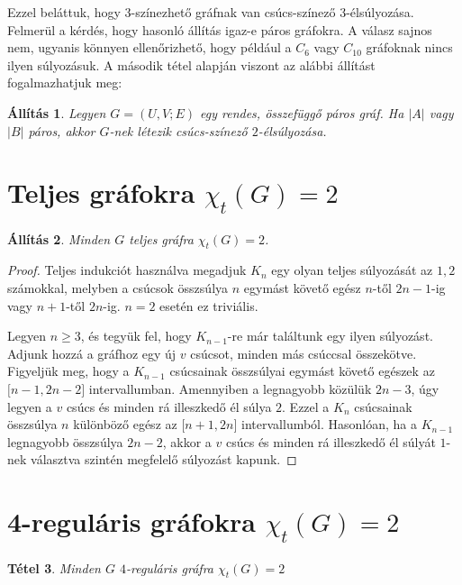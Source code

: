 \documentclass[12pt, a4paper]{report}
\newtheorem{tét}{Tétel}[section]
\newtheorem{áll}[tét]{Állítás}
\theoremstyle{remark}
\theoremstyle{definition}
\begin{document}
Ezzel beláttuk, hogy $3$-színezhető gráfnak van csúcs-színező $3$-élsúlyozása. Felmerül a kérdés, hogy hasonló állítás igaz-e páros gráfokra. A válasz sajnos nem, ugyanis könnyen ellenőrizhető, hogy például a $C_6$ vagy $C_{10}$ gráfoknak nincs ilyen súlyozásuk. A második tétel alapján viszont az alábbi állítást fogalmazhatjuk meg:

\begin{áll}
Legyen $G = (U, V; E)$ egy rendes, összefüggő páros gráf. Ha $|A|$ vagy $|B|$ páros, akkor $G$-nek létezik csúcs-színező $2$-élsúlyozása.
\end{áll}

\section{Teljes gráfokra $χ_t(G) = 2$}

\begin{áll}
Minden $G$ teljes gráfra $\chi_t(G) = 2$.
\end{áll}

\begin{proof}
Teljes indukciót használva megadjuk $K_n$ egy olyan teljes súlyozását az $1, 2$ számokkal, melyben a csúcsok összsúlya $n$ egymást követő egész $n$-től $2n - 1$-ig vagy $n + 1$-től $2n$-ig. $n = 2$ esetén ez triviális.

Legyen $n \geq 3$, és tegyük fel, hogy $K_{n - 1}$-re már találtunk egy ilyen súlyozást. Adjunk hozzá a gráfhoz egy új $v$ csúcsot, minden más csúccsal összekötve. Figyeljük meg, hogy a $K_{n - 1}$ csúcsainak összsúlyai egymást követő egészek az $\lbrack n - 1, 2n - 2 \rbrack$ intervallumban. Amennyiben a legnagyobb közülük $2n - 3$, úgy legyen a $v$ csúcs és minden rá illeszkedő él súlya $2$. Ezzel a $K_n$ csúcsainak összsúlya $n$ különböző egész az $\lbrack n + 1, 2n \rbrack$ intervallumból. Hasonlóan, ha a $K_{n - 1}$ legnagyobb összsúlya $2n - 2$, akkor a $v$ csúcs és minden rá illeszkedő él súlyát $1$-nek választva szintén megfelelő súlyozást kapunk.
\end{proof}

\section{4-reguláris gráfokra $χ_t(G) = 2$}

\begin{tét}
Minden $G$ $4$-reguláris gráfra $\chi_t(G) = 2$
\end{tét}
\end{document}
